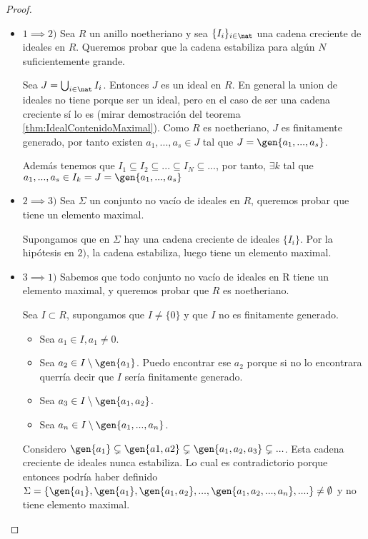 \begin{proof}
	\begin{itemize}
		\item $1 \implies 2)$ Sea $R$ un anillo noetheriano y sea $\{I_i\}_{i \in \nat}$ una cadena creciente de ideales en $R$. Queremos probar que la cadena estabiliza para algún $N$ suficientemente grande.

		Sea $J= \bigcup_{i \in \nat} I_i$. Entonces $J$  es un ideal en $R$. En general la union de ideales no tiene porque ser un ideal, pero en el caso de ser una cadena creciente sí lo es (mirar demostración del teorema \ref{thm:IdealContenidoMaximal}). Como $R$ es noetheriano, $J$ es finitamente generado, por tanto existen $a_1,...,a_s \in J$ tal que $J=\gen{a_1,...,a_s}$.

		Además tenemos que $I_1 \subseteq I_2 \subseteq ... \subseteq I_N \subseteq ...$, por tanto, $\exists k$ tal que  $a_1,...,a_s \in I_k = J = \gen{a_1,...,a_s}$

		\item $2 \implies 3)$ Sea $\Sigma$ un conjunto no vacío de ideales en $R$, queremos probar que tiene un elemento maximal.

		Supongamos que en $\Sigma$ hay una cadena creciente de ideales $\{I_i\}$. Por la hipótesis en $2)$, la cadena estabiliza, luego tiene un elemento maximal.

		\item $3 \implies 1)$ Sabemos que todo conjunto no vacío de ideales en R tiene un elemento maximal, y queremos probar que $R$ es noetheriano.

		Sea $I \subset R$, supongamos que $I\neq \{0\}$ y que $I$ no es finitamente generado.
		\begin{itemize}
			\item Sea $a_1 \in I, a_1 \neq 0$.
			\item Sea $a_2 \in I\setminus \gen{a_1}$. Puedo encontrar ese $a_2$ porque si no lo encontrara querría decir que $I$ sería finitamente generado.
			\item Sea $a_3 \in I\setminus \gen{a_1,a_2}$.
			\item Sea $a_n \in I\setminus \gen{a_1,...,a_n}$.
		\end{itemize}
		Considero $\gen{a_1}\subsetneq \gen{a1,a2} \subsetneq \gen{a_1,a_2,a_3} \subsetneq...$. Esta cadena creciente de ideales nunca estabiliza. Lo cual es contradictorio porque entonces podría haber definido $\Sigma=\{ \gen{a_1}, \gen{a_1},\gen{a_1,a_2},...,\gen{a_1,a_2,...,a_n},.... \} \neq \emptyset$ y no tiene elemento maximal.
	\end{itemize}
\end{proof}

